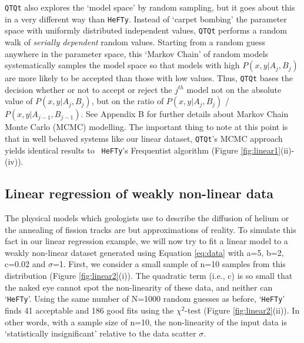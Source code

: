 \documentclass{article}
\begin{document}
{\tt QTQt} also explores the `model space' by random sampling, but it
goes about this in a very different way than {\tt HeFTy}. Instead of
`carpet bombing' the parameter space with uniformly distributed
independent values, {\tt QTQt} performs a random walk of {\it serially
  dependent} random values. Starting from a random guess anywhere in
the parameter space, this `Markov Chain' of random models
systematically samples the model space so that models with high
$P(x,y|A_j,B_j)$ are more likely to be accepted than those with low
values. Thus, {\tt QTQt} bases the decision whether or not to accept
or reject the $j^{th}$ model not on the absolute value of
$P(x,y|A_j,B_j)$, but on the ratio of $P(x,y|A_j,B_j)$ /
$P(x,y|A_{j-1},B_{j-1})$.  See Appendix B for further details about
Markov Chain Monte Carlo (MCMC) modelling.  The important thing to
note at this point is that in well behaved systems like our linear
dataset, {\tt QTQt}'s MCMC approach yields identical results to {\tt
  HeFTy}'s Frequentist algorithm (Figure \ref{fig:linear1}(ii)-(iv)).


\subsection{Linear regression of weakly non-linear data}
\label{sec:nonlinear}

The physical models which geologists use to describe the diffusion of
helium or the annealing of fission tracks are but approximations of
reality.  To simulate this fact in our linear regression example, we
will now try to fit a linear model to a weakly non-linear dataset
generated using Equation \ref{eq:data} with a=5, b=2, c=0.02 and
$\sigma$=1. First, we consider a small sample of n=10 samples from
this distribution (Figure \ref{fig:linear2}(i)).  The quadratic term
(i.e., c) is so small that the naked eye cannot spot the non-linearity
of these data, and neither can `{\tt HeFTy}'. Using the same number of
N=1000 random guesses as before, `{\tt HeFTy}' finds 41 acceptable and
186 good fits using the $\chi^2$-test (Figure
\ref{fig:linear2}(ii)). In other words, with a sample size of n=10,
the non-linearity of the input data is `statistically insignificant'
relative to the data scatter $\sigma$.\\
\end{document}
